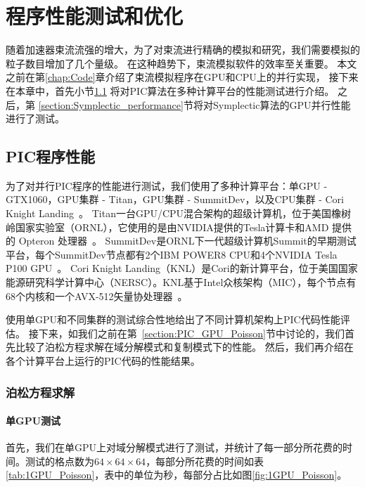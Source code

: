 \chapter{程序性能测试和优化} \label{chap:Performance}
随着加速器束流流强的增大，为了对束流进行精确的模拟和研究，我们需要模拟的粒子数目增加了几个量级。
在这种趋势下，束流模拟软件的效率至关重要。
本文之前在第\ref{chap:Code}章介绍了束流模拟程序在GPU和CPU上的并行实现，
接下来在本章中，首先小节\ref{section:PIC_performance} 将对PIC算法在多种计算平台的性能测试进行介绍。
之后，第 \ref{section:Symplectic_performance}节将对Symplectic算法的GPU并行性能进行了测试。

\section{PIC程序性能}             \label{section:PIC_performance}
为了对并行PIC程序的性能进行测试，我们使用了多种计算平台：单GPU - GTX1060，GPU集群 - Titan，GPU集群 - SummitDev，以及CPU集群 - Cori Knight Landing~\cite{tiwari2015Titan,wells2016Summit,he2018Cori}。
Titan一台GPU/CPU混合架构的超级计算机，位于美国橡树岭国家实验室（ORNL），它使用的是由NVIDIA提供的Tesla计算卡和AMD 提供的 Opteron 处理器~\cite{TitanURL}。
SummitDev是ORNL下一代超级计算机Summit的早期测试平台，每个SummitDev节点都有2个IBM POWER8 CPU和4个NVIDIA Tesla P100 GPU~\cite{SummitURL}。
Cori Knight Landing（KNL）是Cori的新计算平台，位于美国国家能源研究科学计算中心（NERSC）。KNL基于Intel众核架构（MIC），每个节点有68个内核和一个AVX-512矢量协处理器~\cite{KnlURL}。

使用单GPU和不同集群的测试综合性地给出了不同计算机架构上PIC代码性能评估。
接下来，如我们之前在第~\ref{section:PIC_GPU_Poisson}节中讨论的，我们首先比较了泊松方程求解在域分解模式和复制模式下的性能。
然后，我们再介绍在各个计算平台上运行的PIC代码的性能结果。

\subsection{泊松方程求解}
\label{section:PIC_performance_Poisson}

\subsubsection{单GPU测试}
首先，我们在单GPU上对域分解模式进行了测试，并统计了每一部分所花费的时间。测试的格点数为$64 \times 64 \times 64$，每部分所花费的时间如表\ref{tab:1GPU_Poisson}，表中的单位为秒，每部分占比如图\ref{fig:1GPU_Poisson}。

